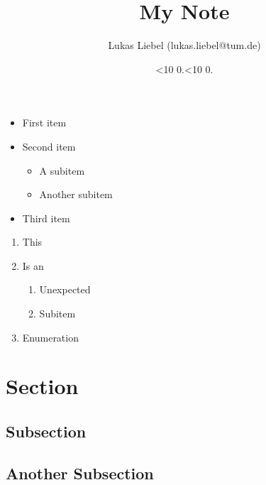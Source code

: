 \documentclass[lang=english]{tumnote} %
\newcommand{\leadingzero}[1]{\ifnum #1<10 0\the#1\else\the#1\fi}
\newcommand{\todayDDMMYYYY}{\leadingzero{\day}.\leadingzero{\month}.\the\year}
\begin{document}
\title{My Note}
\author{Lukas Liebel (lukas.liebel@tum.de)}
\date{\todayDDMMYYYY}
\maketitle

\lipsum[1-1]
\begin{itemize}
  \item First item
  \item Second item
  \begin{itemize}
    \item A subitem
    \item Another subitem
  \end{itemize}
  \item Third item
\end{itemize}

\lipsum[2-2]
\begin{enumerate}
  \item This
  \item Is an
  \begin{enumerate}
    \item Unexpected
    \item Subitem
  \end{enumerate}
  \item Enumeration
\end{enumerate}

\section{Section}

\lipsum[3-3]

\subsection{Subsection}
\lipsum[4-5]

\subsection{Another Subsection}
\lipsum[6-7]
\end{document}
